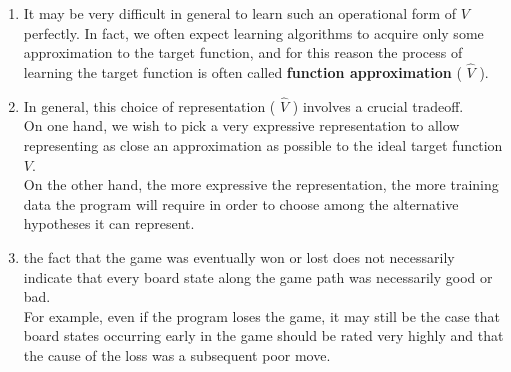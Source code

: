 \begin{enumerate}[itemsep=0.2cm]
    \item It may be very difficult in general to learn such an operational form of $V$ perfectly. In fact, we often expect learning algorithms to acquire only some approximation to the target function, and for this reason the process of learning the target function is often called \textbf{function approximation} ( $\hat{V}$ ).
    \hfill \cite{ml/book/Machine-Learning/Tom-M-Mitchell}

    \item In general, this choice of representation ( $\hat{V}$ ) involves a crucial tradeoff.
    \\
    On one hand, we wish to pick a very expressive representation to allow representing as close an approximation as possible to the ideal target function $V$.
    \\
    On the other hand, the more expressive the representation, the more training data the program will require in order to choose among the alternative hypotheses it can represent.
    \hfill \cite{ml/book/Machine-Learning/Tom-M-Mitchell}


    \item the fact that the game was eventually won or lost does not necessarily indicate that every board state along the game path was necessarily good or bad.
    \hfill \cite{ml/book/Machine-Learning/Tom-M-Mitchell}
    \\
    For example, even if the program loses the game, it may still be the case that board states occurring early in the game should be rated very highly and that the cause of the loss was a subsequent poor move. 
    \hfill \cite{ml/book/Machine-Learning/Tom-M-Mitchell}


    





\end{enumerate}
